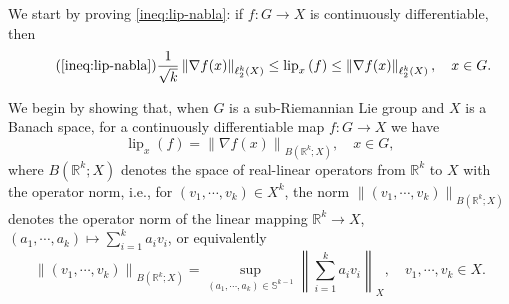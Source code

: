 \documentclass[11pt,reqno]{amsart}
\newcommand{\1}{\mathbf 1}
\begin{document}
We start by proving \eqref{ineq:lip-nabla}: if $f:G\to X$ is continuously differentiable, then
\[\tag{\ref{ineq:lip-nabla}}
    \frac{1}{\sqrt{k}}\left\|\nabla f(x)\right\|_{\ell_2^k\left(X\right)}\le \operatorname{lip}_x\left(f\right)\le \left\|\nabla f(x)\right\|_{\ell_2^k\left(X\right)},\quad x\in G.
\]

We begin by showing that, when $G$ is a sub-Riemannian Lie group and $X$ is a Banach space, for a continuously differentiable map $f:G\to X$ we have
\begin{equation}\label{eq:lip-nabla}
    \operatorname{lip}_x\left(f\right)=\left\|\nabla f(x)\right\|_{B\left(\mathbb{R}^k; X\right)},\quad x\in G,
\end{equation}
where $B\left(\mathbb{R}^k; X\right)$ denotes the space of real-linear operators from $\mathbb{R}^k$ to $X$ with the operator norm, i.e., for $\left(v_1,\cdots,v_k\right)\in X^k$, the norm $\left\|\left(v_1,\cdots,v_k\right)\right\|_{B\left(\mathbb{R}^k; X\right)}$ denotes the operator norm of the linear mapping $\mathbb{R}^k\to X$, $\left(a_1,\cdots,a_k\right)\mapsto \sum_{i=1}^k a_iv_i$, or equivalently
\[
\left\|\left(v_1,\cdots,v_k\right)\right\|_{B\left(\mathbb{R}^k; X\right)}=\sup_{\left(a_1,\cdots,a_k\right)\in \mathbb{S}^{k-1}}\left\|\sum_{i=1}^k a_iv_i\right\|_X,\quad v_1,\cdots,v_k\in X.
\]
\end{document}
